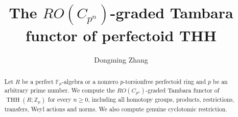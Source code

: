 \documentclass{amsart}
\theoremstyle{definition}
\theoremstyle{remark}
\numberwithin{equation}{section}
\begin{document}
\author{Dongming Zhang}
\title[The $RO(C_{p^n})$-graded Tambara functor of perfectoid THH]{The $RO(C_{p^n})$-graded Tambara functor of perfectoid THH}
\begin{abstract}
Let $R$ be a perfect $\mathbb F_p$-algebra or a nonzero
$p$-torsionfree perfectoid ring and $p$ be an arbitrary prime number. We compute the $RO(C_{p^n})$-graded
Tambara functor of $\operatorname{THH}(R;\mathbb Z_p)$ for every $n\ge0$, including all homotopy groups, products, restrictions,
transfers, Weyl actions and norms.
We also compute genuine cyclotomic restriction. 
\end{abstract}
\maketitle
\setcounter{tocdepth}{1}
\tableofcontents





\appendix



\enlargethispage{2\baselineskip}


\end{document}
